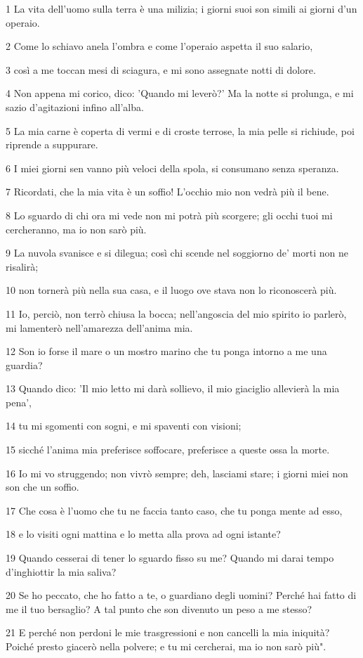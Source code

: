 \par 1 La vita dell'uomo sulla terra è una milizia; i giorni suoi son simili ai giorni d'un operaio.
\par 2 Come lo schiavo anela l'ombra e come l'operaio aspetta il suo salario,
\par 3 così a me toccan mesi di sciagura, e mi sono assegnate notti di dolore.
\par 4 Non appena mi corico, dico: 'Quando mi leverò?' Ma la notte si prolunga, e mi sazio d'agitazioni infino all'alba.
\par 5 La mia carne è coperta di vermi e di croste terrose, la mia pelle si richiude, poi riprende a suppurare.
\par 6 I miei giorni sen vanno più veloci della spola, si consumano senza speranza.
\par 7 Ricordati, che la mia vita è un soffio! L'occhio mio non vedrà più il bene.
\par 8 Lo sguardo di chi ora mi vede non mi potrà più scorgere; gli occhi tuoi mi cercheranno, ma io non sarò più.
\par 9 La nuvola svanisce e si dilegua; così chi scende nel soggiorno de' morti non ne risalirà;
\par 10 non tornerà più nella sua casa, e il luogo ove stava non lo riconoscerà più.
\par 11 Io, perciò, non terrò chiusa la bocca; nell'angoscia del mio spirito io parlerò, mi lamenterò nell'amarezza dell'anima mia.
\par 12 Son io forse il mare o un mostro marino che tu ponga intorno a me una guardia?
\par 13 Quando dico: 'Il mio letto mi darà sollievo, il mio giaciglio allevierà la mia pena',
\par 14 tu mi sgomenti con sogni, e mi spaventi con visioni;
\par 15 sicché l'anima mia preferisce soffocare, preferisce a queste ossa la morte.
\par 16 Io mi vo struggendo; non vivrò sempre; deh, lasciami stare; i giorni miei non son che un soffio.
\par 17 Che cosa è l'uomo che tu ne faccia tanto caso, che tu ponga mente ad esso,
\par 18 e lo visiti ogni mattina e lo metta alla prova ad ogni istante?
\par 19 Quando cesserai di tener lo sguardo fisso su me? Quando mi darai tempo d'inghiottir la mia saliva?
\par 20 Se ho peccato, che ho fatto a te, o guardiano degli uomini? Perché hai fatto di me il tuo bersaglio? A tal punto che son divenuto un peso a me stesso?
\par 21 E perché non perdoni le mie trasgressioni e non cancelli la mia iniquità? Poiché presto giacerò nella polvere; e tu mi cercherai, ma io non sarò più".

